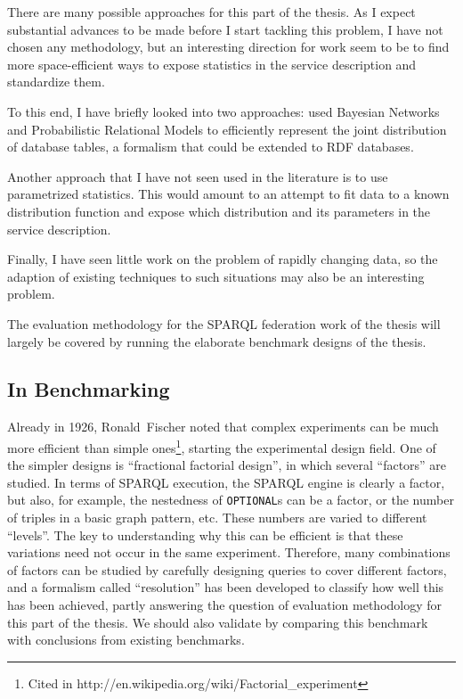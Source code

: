 \documentclass{llncs}
\begin{document}
There are many possible approaches for this part of the thesis. As I
expect substantial advances to be made before I start tackling this
problem, I have not chosen any methodology, but an interesting
direction for work seem to be to find more space-efficient ways to
expose statistics in the service description and standardize them.

To this end, I have briefly looked into two approaches:
\cite{Getoor:2001:SEU:375663.375727} used Bayesian Networks and
Probabilistic Relational Models to efficiently represent the joint
distribution of database tables, a formalism that could be extended to
RDF databases.

Another approach that I have not seen used in the literature is to use
parametrized statistics. This would amount to an attempt to fit data to
a known distribution function and expose which distribution and its
parameters in the service description.

Finally, I have seen little work on the problem of rapidly changing
data, so the adaption of existing techniques to such situations may
also be an interesting problem.

The evaluation methodology for the SPARQL federation work of the
thesis will largely be covered by running the elaborate benchmark
designs of the thesis.

\subsection{In Benchmarking}\label{sec:benchmethod}

Already in 1926, Ronald~Fischer noted that complex experiments can be
much more efficient than simple ones\footnote{Cited in
  http://en.wikipedia.org/wiki/Factorial\_experiment}, starting the
experimental design field. One of the simpler designs is ``fractional
factorial design'', in which several ``factors'' are studied. In terms
of SPARQL execution, the SPARQL engine is clearly a factor, but also,
for example, the nestedness of \texttt{OPTIONAL}s can be a factor, or
the number of triples in a basic graph pattern, etc. These numbers are
varied to different ``levels''. The key to understanding why this can
be efficient is that these variations need not occur in the same
experiment. Therefore, many combinations of factors can be studied by
carefully designing queries to cover different factors, and a
formalism called ``resolution'' has been developed to classify how
well this has been achieved, partly answering the question of
evaluation methodology for this part of the thesis. We should also
validate by comparing this benchmark with conclusions from existing
benchmarks.
\end{document}
